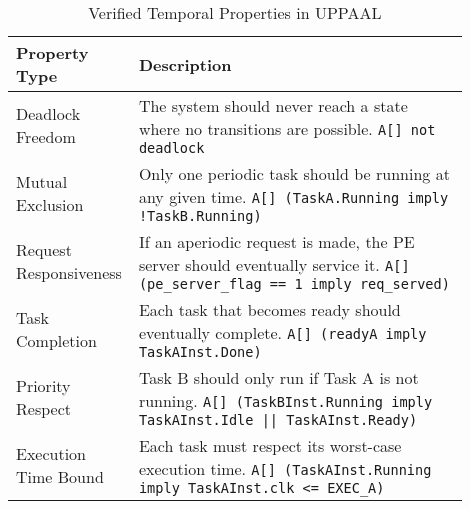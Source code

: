 \documentclass[conference]{IEEEtran}
\begin{document}
\begin{table}[H]
\centering
\caption{Verified Temporal Properties in UPPAAL}
\begin{tabular}{|p{0.18\linewidth}|p{0.72\linewidth}|}
\hline
\textbf{Property Type} & \textbf{Description} \\
\hline
Deadlock Freedom & The system should never reach a state where no transitions are possible. \newline \texttt{A[] not deadlock} \\
\hline
Mutual Exclusion & Only one periodic task should be running at any given time. \newline \texttt{A[] (TaskA.Running imply !TaskB.Running)} \\
\hline
Request Responsiveness & If an aperiodic request is made, the PE server should eventually service it. \newline \texttt{A[] (pe\_server\_flag == 1 imply req\_served)} \\
\hline
Task Completion & Each task that becomes ready should eventually complete. \newline \texttt{A[] (readyA imply TaskAInst.Done)} \\
\hline
Priority Respect & Task B should only run if Task A is not running. \newline \texttt{A[] (TaskBInst.Running imply TaskAInst.Idle || TaskAInst.Ready)} \\
\hline
Execution Time Bound & Each task must respect its worst-case execution time. \newline \texttt{A[] (TaskAInst.Running imply TaskAInst.clk \textless= EXEC\_A)} \\
\hline
\end{tabular}
\label{tab:temporal_properties}
\end{table}



\end{document}

